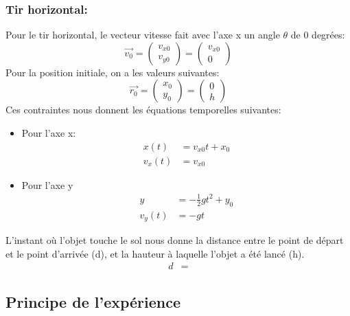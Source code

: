 \documentclass[12pt,a4paper]{article}
\begin{document}
    \subsubsection{Tir horizontal:}
    Pour le tir horizontal, le vecteur vitesse fait avec l'axe x un angle $\theta$ de 0 degrées:
    \begin{equation*}
        \vec{v_0}=
        \begin{pmatrix}
            v_{x0} \\
            v_{y0}
        \end{pmatrix}
        =
        \begin{pmatrix}
            v_{x0} \\
            0
        \end{pmatrix}
    \end{equation*}
    Pour la position initiale, on a les valeurs suivantes:
    \begin{equation*}
        \vec{r_0}=
        \begin{pmatrix}
            x_0 \\
            y_0
        \end{pmatrix}
        =
        \begin{pmatrix}
            0 \\
            h
        \end{pmatrix}
    \end{equation*}
    Ces contraintes nous donnent les équations temporelles suivantes:
    \begin{itemize}
        \item Pour l'axe x:
        \begin{align*}
            x(t)&=v_{x0}t+x_0 \\
            v_x(t)&=v_{x0}
        \end{align*}
        \item Pour l'axe y
        \begin{align*}
            y&=-\frac{1}{2}gt^2+y_0 \\
            v_y(t)&=-gt
        \end{align*}
    \end{itemize}
    L'instant où l'objet touche le sol nous donne la distance entre le point de départ et le point d'arrivée (d), et la hauteur à laquelle l'objet a été lancé (h).
    \begin{align*}
        d&=
    \end{align*}
    \subsection{Principe de l'expérience}
\end{document}
